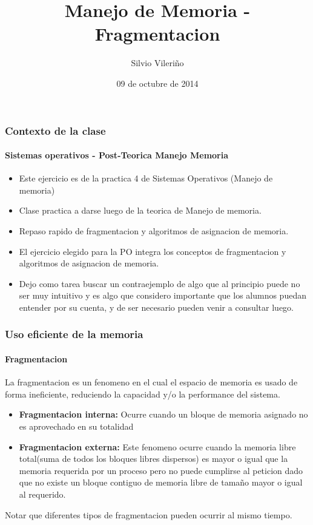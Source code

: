 \documentclass{beamer}
\title{Manejo de Memoria - Fragmentacion}
\author{Silvio Vileriño}
\date{09 de octubre de 2014}
\begin{document}
\begin{frame}
  \maketitle
\end{frame}

\begin{frame}
  \frametitle{Contexto de la clase}    
  \framesubtitle{Sistemas operativos - Post-Teorica Manejo Memoria}
  \begin{itemize}
    \setlength{\itemsep}{2pt}
    \item Este ejercicio es de la practica 4 de Sistemas Operativos (Manejo de memoria)
    \pause
    \item Clase practica a darse luego de la teorica de Manejo de memoria.
    \pause
    \item Repaso rapido de fragmentacion y algoritmos de asignacion de memoria.
    \pause
    \item El ejercicio elegido para la PO integra los conceptos de fragmentacion y algoritmos de asignacion de memoria.
    \pause
    \item Dejo como tarea buscar un contraejemplo de algo que al principio puede no ser muy intuitivo y es algo que considero importante que los alumnos puedan entender por su cuenta, y de ser necesario pueden venir a consultar luego.
  \end{itemize}
\end{frame}

\begin{frame}
  \frametitle{Uso eficiente de la memoria}    
  \framesubtitle{Fragmentacion}
  La fragmentacion es un fenomeno en el cual el espacio de memoria es usado de forma ineficiente, reduciendo la capacidad y/o la performance del sistema.
  \pause
  \begin{itemize}
    \setlength{\itemsep}{15pt}
    \item \textbf{Fragmentacion interna:} Ocurre cuando un bloque de memoria asignado no es aprovechado en su totalidad
    \pause
    \item \textbf{Fragmentacion externa:} Este fenomeno ocurre cuando la memoria libre total(suma de todos los bloques libres dispersos) es mayor o igual que la memoria requerida por un proceso pero no puede cumplirse al peticion dado que no existe un bloque contiguo de memoria libre de tamaño mayor o igual al requerido.
  \end{itemize}
  \vspace{15pt}
  \pause
  Notar que diferentes tipos de fragmentacion pueden ocurrir al mismo tiempo.
\end{frame}
\end{document}
